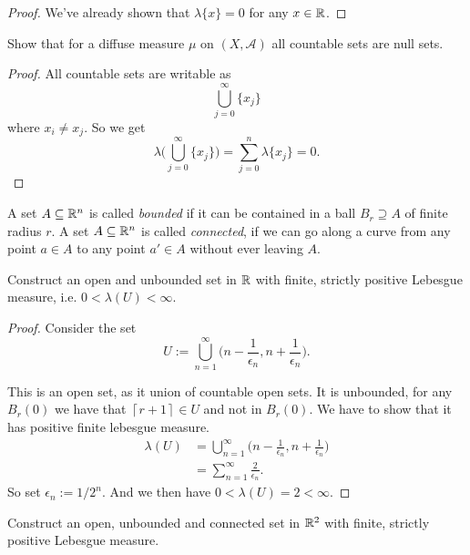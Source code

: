 \begin{proof}
We've already shown that \(\lambda \{x\}=0\) for any \(x\in \Bbb{R}\).
\end{proof}

\begin{thm}
Show that for a diffuse measure \(\mu \) on \((X,\mathcal{A})\) all countable sets are null sets.
\end{thm}

\begin{proof}
All countable sets are writable as
\[
\bigcup _{j=0}^\infty \{x_{j}\}
\]
where \(x_{i}\neq x_{j}\). So we get
\[
\lambda \bigg(\bigcup _{j=0}^\infty \{x_{j}\}\bigg)=\sum _{j=0}^n\lambda \{x_{j}\}=0.
\]
\end{proof}

\begin{defn}
A set \(A\subseteq \Bbb{R}^n\) is called \emph{bounded} if it can be contained in a ball \(B_{r}\supseteq A\) of finite radius \(r\). A set \(A\subseteq \Bbb{R}^n\) is called \emph{connected}, if we can go along a curve from any point \(a\in A\) to any point \(a'\in A\) without ever leaving \(A\).
\end{defn}

\begin{thm}[Problem 6.6a]
Construct an open and unbounded set in \(\Bbb{R}\) with finite, strictly positive Lebesgue measure, i.e. \(0< \lambda(U)<\infty\).
\end{thm}

\begin{proof}
Consider the set
\[
U:=\bigcup _{n=1}^\infty  \bigg(n-\frac{1}{\epsilon_{n}},n+\frac{1}{\epsilon_{n}}\bigg).
\]

This is an open set, as it union of countable open sets. It is unbounded, for any \(B_{r}(0)\) we have that $\left \lceil {r+1}\right \rceil \in U$ and not in \(B_{r}(0)\). We have to show that it has positive finite lebesgue measure.
\begin{align*}
\lambda (U)&=\bigcup _{n=1}^\infty  \bigg(n-\frac{1}{\epsilon_{n}},n+\frac{1}{\epsilon_{n}}\bigg)\\
&=\sum _{n=1}^\infty \frac{2}{\epsilon_{n}}.
\end{align*}
So set \(\epsilon_{n}:=1/2^n.\) And we then have \(0<\lambda (U)=2<\infty .\)

\end{proof}

\begin{thm}[Problem 6.6ii]
Construct an open, unbounded and connected set in \(\Bbb{R}^2\) with finite, strictly positive Lebesgue measure.
\end{thm}

